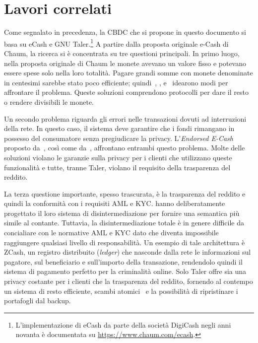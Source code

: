 \documentclass{article}
\begin{document}
\hypertarget{lavori-correlati}{%
\section{Lavori correlati}\label{6.-lavori-correlati}}

Come segnalato in precedenza, la CBDC che si propone in questo documento 
si basa su eCash e GNU Taler.\footnote{L'implementazione di eCash 
da parte della società DigiCash negli anni novanta è documentata su 
\url{https://www.chaum.com/ecash}.} A partire dalla proposta originale 
e-Cash di Chaum, la ricerca si è concentrata su tre questioni principali. 
In primo luogo, nella proposta originale di Chaum le monete avevano un 
valore fisso e potevano essere spese solo nella loro totalità. Pagare 
grandi somme con monete denominate in centesimi sarebbe stato poco 
efficiente; quindi~\cite{Okamoto}, \cite{Camenisch2005}, \cite{Canard} 
e~\cite{Dold} idearono modi per affrontare il problema. Queste soluzioni 
comprendono protocolli per dare il resto o rendere divisibili le monete.

Un secondo problema riguarda gli errori nelle transazioni dovuti ad 
interruzioni della rete. In questo caso, il sistema deve garantire che 
i fondi rimangano in possesso del consumatore senza pregiudicare la 
privacy. L'\textit{Endorsed E-Cash} proposto da~\cite{Camenisch2007}, 
così come da~\cite{Dold}, affrontano entrambi questo problema. Molte 
delle soluzioni violano le garanzie sulla privacy per i clienti che 
utilizzano queste funzionalità e tutte, tranne Taler, violano il 
requisito della trasparenza del reddito.

La terza questione importante, spesso trascurata, è la trasparenza del 
reddito e quindi la conformità con i requisiti AML e KYC. \cite{Fuchsbauer} 
hanno deliberatamente progettato il loro sistema di disintermediazione 
per fornire una semantica più simile al contante. Tuttavia, la 
disintermediazione totale è in genere difficile da concialiare con le 
normative AML e KYC dato che diventa impossibile raggiungere qualsiasi 
livello di responsabilità. Un esempio di tale architettura è ZCash, un 
registro distribuito (\textit{ledger}) che nasconde dalla rete le 
informazioni sul pagatore, sul beneficiario e sull'importo della 
transazione, rendendolo quindi il sistema di pagamento perfetto per la 
criminalità online. Solo Taler offre sia una privacy costante per i 
clienti che la trasparenza del reddito, fornendo al contempo un sistema 
di resto efficiente, scambi atomici~\cite[vedi][]{Camenisch2007} e la 
possibilità di ripristinare i portafogli dal backup.
\end{document}
